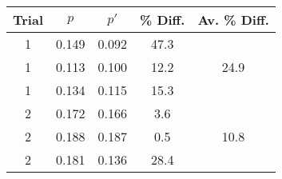 \begin{tabular}{ | c | c c | c | c | } \hline
    Trial & $p$ & $p'$ & \% Diff. & Av. \% Diff. \\ \hline
    1 & 0.149 & 0.092 & 47.3 & \multirow{3}{*}{24.9} \\
    1 & 0.113 & 0.100 & 12.2 & \\
    1 & 0.134 & 0.115 & 15.3 & \\ \hline
    2 & 0.172 & 0.166 & 3.6 & \multirow{3}{*}{10.8} \\
    2 & 0.188 & 0.187 & 0.5 & \\
    2 & 0.181 & 0.136 & 28.4 & \\ \hline
\end{tabular}
